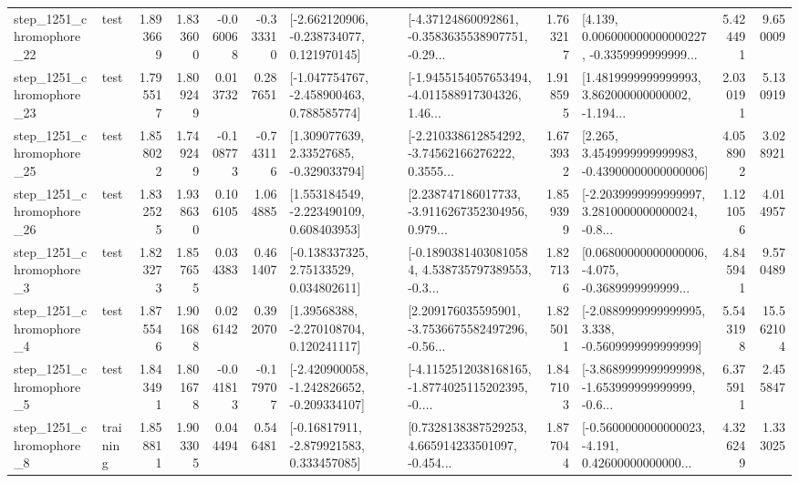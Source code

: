 \begin{tabular}{llrrrrllrlrr}
 step\_1251\_chromophore\_22 &      test &      1.893669 &    1.833600 &     -0.060068 & -0.333310 &   [-2.662120906, -0.238734077, 0.121970145] &  [-4.37124860092861, -0.3583635538907751, -0.29... &       1.763217 &  [4.139, 0.006000000000000227, -0.3359999999999... &            5.424491 &          9.650009 \\
 step\_1251\_chromophore\_23 &      test &      1.795517 &    1.809249 &      0.013732 &  0.287651 &   [-1.047754767, -2.458900463, 0.788585774] &  [-1.9455154057653494, -4.011588917304326, 1.46... &       1.918595 &  [1.4819999999999993, 3.862000000000002, -1.194... &            2.030191 &          5.130919 \\
 step\_1251\_chromophore\_25 &      test &      1.858022 &    1.749249 &     -0.108773 & -0.743116 &     [1.309077639, 2.33527685, -0.329033794] &  [-2.210338612854292, -3.74562166276222, 0.3555... &       1.673932 &  [2.265, 3.4549999999999983, -0.43900000000000006] &            4.058902 &          3.028921 \\
 step\_1251\_chromophore\_26 &      test &      1.832525 &    1.938630 &      0.106105 &  1.064885 &    [1.553184549, -2.223490109, 0.608403953] &  [2.238747186017733, -3.9116267352304956, 0.979... &       1.859399 &  [-2.2039999999999997, 3.2810000000000024, -0.8... &            1.121056 &          4.014957 \\
  step\_1251\_chromophore\_3 &      test &      1.823273 &    1.857655 &      0.034383 &  0.461407 &     [-0.138337325, 2.75133529, 0.034802611] &  [-0.18903814030810584, 4.538735797389553, -0.3... &       1.827136 &  [0.06800000000000006, -4.075, -0.3689999999999... &            4.845941 &          9.570489 \\
  step\_1251\_chromophore\_4 &      test &      1.875546 &    1.901688 &      0.026142 &  0.392070 &     [1.39568388, -2.270108704, 0.120241117] &  [2.209176035595901, -3.7536675582497296, -0.56... &       1.825011 &  [-2.0889999999999995, 3.338, -0.5609999999999999] &            5.543198 &         15.562104 \\
  step\_1251\_chromophore\_5 &      test &      1.843491 &    1.801678 &     -0.041813 & -0.179707 &  [-2.420900058, -1.242826652, -0.209334107] &  [-4.1152512038168165, -1.8774025115202395, -0.... &       1.847103 &  [-3.8689999999999998, -1.653999999999999, -0.6... &            6.375911 &          2.455847 \\
  step\_1251\_chromophore\_8 &  training &      1.858811 &    1.903305 &      0.044494 &  0.546481 &    [-0.16817911, -2.879921583, 0.333457085] &  [0.7328138387529253, 4.665914233501097, -0.454... &       1.877044 &  [-0.5600000000000023, -4.191, 0.42600000000000... &            4.326249 &          1.333025 \\

\end{tabular}
